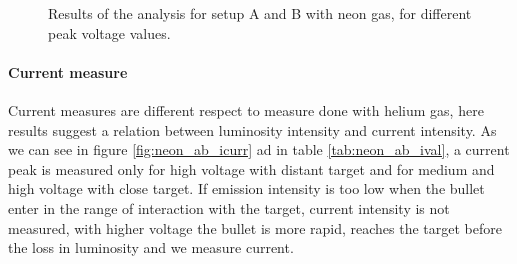 \begin{figure}
 \hfill
 \caption{Results of the analysis for setup A and B with neon gas, for different peak voltage values.}
 \label{fig:neon_ab_xb}
\end{figure}


\paragraph{Current measure}
Current measures are different respect to measure done with helium gas, here results suggest a relation between luminosity intensity and current intensity. As we can see in figure \ref{fig:neon_ab_icurr} ad in table \ref{tab:neon_ab_ival}, a current peak is measured only for high voltage with distant target and for medium and high voltage with close target. If emission intensity is too low when the bullet enter in the range of interaction with the target, current intensity is not measured, with higher voltage the bullet is more rapid, reaches the target before the loss in luminosity and we measure current.

